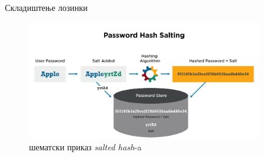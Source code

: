 \documentclass{beamer}
\begin{document}
\begin{frame}[allowframebreaks]{Складиштење лозинки}
\begin{itemize}
            \begin{figure}
                \centering
                \includegraphics[width=0.9\textwidth,height=\textheight,keepaspectratio]{images/hashsalt.png}
                \caption{шематски приказ \textit{salted hash}-a}
                \label{fig:hashsalt}
            \end{figure}
        \end{itemize}
    \end{frame}
    
\end{document}
